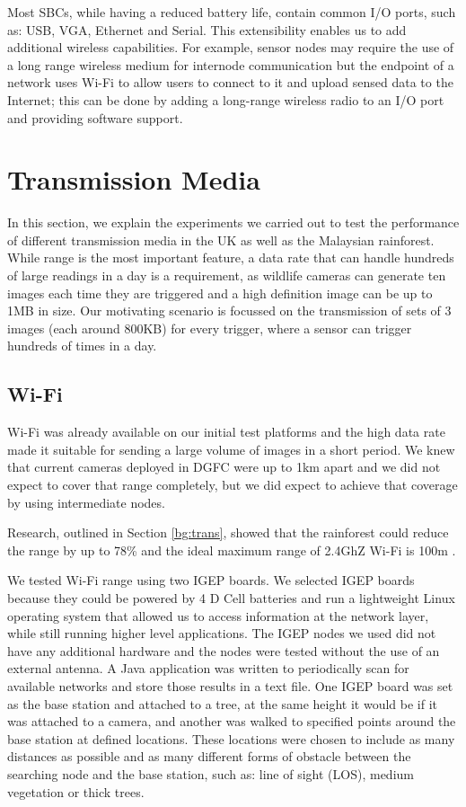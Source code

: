 Most SBCs, while having a reduced battery life, contain common I/O ports, such as: USB, VGA, Ethernet and Serial. This extensibility enables us to add additional wireless capabilities. For example, sensor nodes may require the use of a long range wireless medium for internode communication but the endpoint of a network uses Wi-Fi to allow users to connect to it and upload sensed data to the Internet; this can be done by adding a long-range wireless radio to an I/O port and providing software support.

\section{Transmission Media}\label{tech:wireless}
	In this section, we explain the experiments we carried out to test the performance of different transmission media in the UK as well as the Malaysian rainforest. While range is the most important feature, a data rate that can handle hundreds of large readings in a day is a requirement, as wildlife cameras can generate ten images each time they are triggered and a high definition image can be up to 1MB in size. Our motivating scenario is focussed on the transmission of sets of 3 images (each around 800KB) for every trigger, where a sensor can trigger hundreds of times in a day.

\subsection{Wi-Fi}\label{tech:wifi}
Wi-Fi was already available on our initial test platforms and the high data rate made it suitable for sending a large volume of images in a short period. We knew that current cameras deployed in DGFC were up to 1km apart and we did not expect to cover that range completely, but we did expect to achieve that coverage by using intermediate nodes.

Research, outlined in Section \ref{bg:trans}, showed that the rainforest could reduce the range by up to 78\% and the ideal maximum range of 2.4GhZ Wi-Fi is 100m \cite{Dhawan2007}. 

We tested Wi-Fi range using two IGEP boards. We selected IGEP boards because they could be powered by 4 D Cell batteries and run a lightweight Linux operating system that allowed us to access information at the network layer, while still running higher level applications. The IGEP nodes we used did not have any additional hardware and the nodes were tested without the use of an external antenna. A Java application was written to periodically scan for available networks and store those results in a text file. One IGEP board was set as the base station and attached to a tree, at the same height it would be if it was attached to a camera, and another was walked to specified points around the base station at defined locations. These locations were chosen to include as many distances as possible and as many different forms of obstacle between the searching node and the base station, such as: line of sight (LOS), medium vegetation or thick trees.
			
